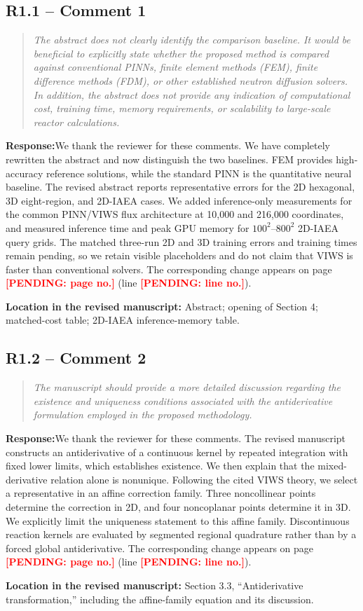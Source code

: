 \documentclass[11pt,a4paper]{article}
\newenvironment{reviewercomment}{\begin{quote}\small\itshape\color{commentgray}}{\end{quote}}
\newcommand{\authorresponse}{\noindent\textbf{Response:}\quad}
\newcommand{\revisionlocation}[1]{\par\noindent\textcolor{locationblue}{\textbf{Location in the revised manuscript: }}#1}
\newcommand{\draftplaceholder}[1]{\textcolor{red}{\textbf{[PENDING: #1]}}}
\begin{document}
\subsection*{R1.1 -- Comment 1}
\begin{reviewercomment}
The abstract does not clearly identify the comparison baseline. It would be beneficial to explicitly state whether the proposed method is compared against conventional PINNs, finite element methods (FEM), finite difference methods (FDM), or other established neutron diffusion solvers. In addition, the abstract does not provide any indication of computational cost, training time, memory requirements, or scalability to large-scale reactor calculations.
\end{reviewercomment}
\authorresponse We thank the reviewer for these comments. We have completely rewritten the abstract and now distinguish the two baselines. FEM provides high-accuracy reference solutions, while the standard PINN is the quantitative neural baseline. The revised abstract reports representative errors for the 2D hexagonal, 3D eight-region, and 2D-IAEA cases. We added inference-only measurements for the common PINN/VIWS flux architecture at 10,000 and 216,000 coordinates, and measured inference time and peak GPU memory for $100^2$--$800^2$ 2D-IAEA query grids. The matched three-run 2D and 3D training errors and training times remain pending, so we retain visible placeholders and do not claim that VIWS is faster than conventional solvers.
The corresponding change appears on page \draftplaceholder{page no.} (line \draftplaceholder{line no.}).
\revisionlocation{Abstract; opening of Section 4; matched-cost table; 2D-IAEA inference-memory table.}

\subsection*{R1.2 -- Comment 2}
\begin{reviewercomment}
The manuscript should provide a more detailed discussion regarding the existence and uniqueness conditions associated with the antiderivative formulation employed in the proposed methodology.
\end{reviewercomment}
\authorresponse We thank the reviewer for these comments. The revised manuscript constructs an antiderivative of a continuous kernel by repeated integration with fixed lower limits, which establishes existence. We then explain that the mixed-derivative relation alone is nonunique. Following the cited VIWS theory, we select a representative in an affine correction family. Three noncollinear points determine the correction in 2D, and four noncoplanar points determine it in 3D. We explicitly limit the uniqueness statement to this affine family. Discontinuous reaction kernels are evaluated by segmented regional quadrature rather than by a forced global antiderivative. The corresponding change appears on page \draftplaceholder{page no.} (line \draftplaceholder{line no.}).
\revisionlocation{Section 3.3, “Antiderivative transformation,” including the affine-family equation and its discussion.}
\end{document}
